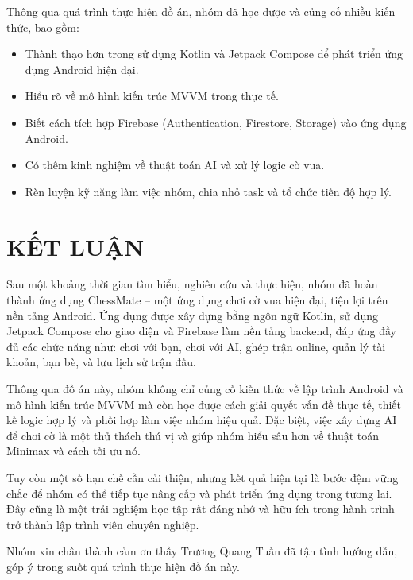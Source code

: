 \documentclass[a4paper,12pt]{article}
\begin{document}
\justify
\noindent Thông qua quá trình thực hiện đồ án, nhóm đã học được và củng cố nhiều kiến thức, bao gồm:
\begin{itemize}[label=·]
    \item Thành thạo hơn trong sử dụng Kotlin và Jetpack Compose để phát triển ứng dụng Android hiện đại.
    \item Hiểu rõ về mô hình kiến trúc MVVM trong thực tế.
    \item Biết cách tích hợp Firebase (Authentication, Firestore, Storage) vào ứng dụng Android.
    \item Có thêm kinh nghiệm về thuật toán AI và xử lý logic cờ vua.
    \item Rèn luyện kỹ năng làm việc nhóm, chia nhỏ task và tổ chức tiến độ hợp lý.
\end{itemize}

\newpage

\section*{\centering \textbf{KẾT LUẬN}} %

\justify
\noindent Sau một khoảng thời gian tìm hiểu, nghiên cứu và thực hiện, nhóm đã hoàn thành ứng dụng ChessMate – một ứng dụng chơi cờ vua hiện đại, tiện lợi trên nền tảng Android. Ứng dụng được xây dựng bằng ngôn ngữ Kotlin, sử dụng Jetpack Compose cho giao diện và Firebase làm nền tảng backend, đáp ứng đầy đủ các chức năng như: chơi với bạn, chơi với AI, ghép trận online, quản lý tài khoản, bạn bè, và lưu lịch sử trận đấu.

\noindent Thông qua đồ án này, nhóm không chỉ củng cố kiến thức về lập trình Android và mô hình kiến trúc MVVM mà còn học được cách giải quyết vấn đề thực tế, thiết kế logic hợp lý và phối hợp làm việc nhóm hiệu quả. Đặc biệt, việc xây dựng AI để chơi cờ là một thử thách thú vị và giúp nhóm hiểu sâu hơn về thuật toán Minimax và cách tối ưu nó.

\noindent Tuy còn một số hạn chế cần cải thiện, nhưng kết quả hiện tại là bước đệm vững chắc để nhóm có thể tiếp tục nâng cấp và phát triển ứng dụng trong tương lai. Đây cũng là một trải nghiệm học tập rất đáng nhớ và hữu ích trong hành trình trở thành lập trình viên chuyên nghiệp.

\noindent Nhóm xin chân thành cảm ơn thầy Trương Quang Tuấn đã tận tình hướng dẫn, góp ý trong suốt quá trình thực hiện đồ án này.
\end{document}
